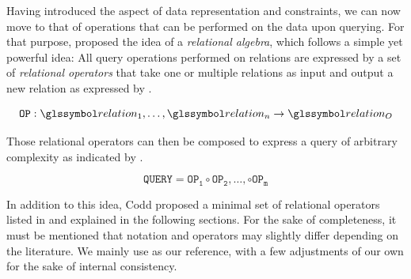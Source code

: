 Having introduced the aspect of data representation and constraints, we can now move to that of operations that can be performed on the data upon querying. For that purpose, \cite{Codd:1970Relational} proposed the idea of a \emph{relational algebra}, which follows a simple yet powerful idea: All query operations performed on relations are expressed by a set of \emph{relational operators} that take one or multiple relations as input and output a new relation as expressed by .

\begin{equation}
    \label{equation:rel_op}
    \mathtt{OP}: \relation_1, \ldots, \relation_n \rightarrow \relation_{O}
\end{equation}

Those relational operators can then be composed to express a query of arbitrary complexity as indicated by .

\begin{equation}
    \label{equation:rel_query}
    \mathtt{QUERY} = \mathtt{OP_{1}} \circ \mathtt{OP_{2}}, \ldots , \circ \mathtt{OP_{m}}
\end{equation}

In addition to this idea, Codd proposed a minimal set of relational operators listed in  and explained in the following sections. For the sake of completeness, it must be mentioned that notation and operators may slightly differ depending on the literature. We mainly use \cite{Garcia:2009Database} as our reference, with a few adjustments of our own for the sake of internal consistency.

